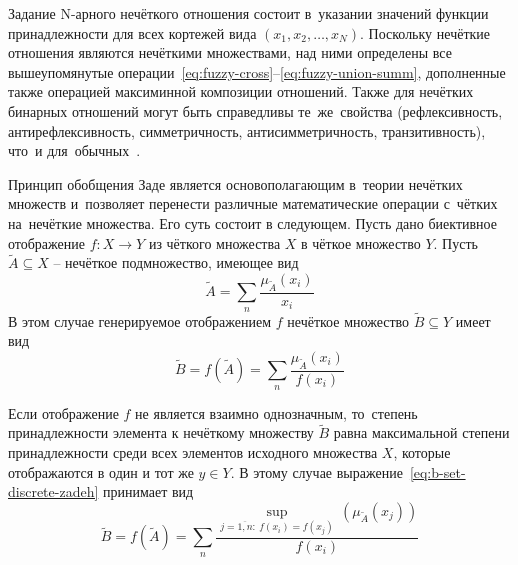 Задание N-арного нечёткого отношения состоит в~указании значений функции принадлежности для всех кортежей вида $\left(x_1, x_2, \ldots, x_N \right)$. Поскольку нечёткие отношения являются нечёткими множествами, над ними определены все вышеупомянутые операции~\eqref{eq:fuzzy-cross}--\eqref{eq:fuzzy-union-summ}, дополненные также операцией максиминной композиции отношений. Также для нечётких бинарных отношений могут быть справедливы те~же~свойства (рефлексивность, антирефлексивность, симметричность, антисимметричность, транзитивность), что~и для~обычных~\cite{Shtovba, Orlovskiy}.

Принцип обобщения Заде является основополагающим в~теории нечётких множеств и~позволяет перенести различные математические операции с~чётких на~нечёткие множества. Его суть состоит в следующем. Пусть дано биективное отображение $f:X\to Y$ из чёткого множества $X$ в чёткое множество $Y$. Пусть $\tilde{A}\subseteq X$ – нечёткое подмножество, имеющее вид
\begin{equation}
\label{eq:a-set-discrete-zadeh}
	\tilde A=\sum\limits_{n} \frac{\mu_{\tilde A}\left( x_i \right)}{x_i}
\end{equation}
В этом случае генерируемое отображением $f$ нечёткое множество $\tilde{B}\subseteq Y$ имеет вид
\begin{equation}
\label{eq:b-set-discrete-zadeh}
	\tilde{B}=f\left( {\tilde{A}} \right)=\sum\limits_{n}{\frac{{{\mu }_{{\tilde{A}}}}\left( {{x}_{i}} \right)}{f\left( {{x}_{i}} \right)}}
\end{equation}

Если отображение $f$ не является взаимно однозначным, то~степень принадлежности элемента к нечёткому множеству $\tilde B$ равна максимальной степени принадлежности среди всех элементов исходного множества $X$, которые отображаются в один и тот же $y\in Y$. В этому случае выражение~\eqref{eq:b-set-discrete-zadeh} принимает вид
\begin{equation}
\label{eq:b-set-zadeh}
	\tilde B=f\left( \tilde A \right)=\sum\limits_{n}{\frac{\underset{j=\overline{1,n}:\ f\left( {{x}_{i}} \right)=f\left( x_j \right)}{\mathop{\sup }}\,\left( {{\mu }_{{\tilde{A}}}}\left( x_j \right) \right)}{f\left( x_i \right)}}
\end{equation}

